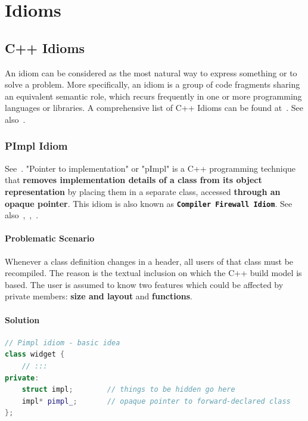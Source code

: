 \chapter{Idioms}
\label{chap:idioms}
\section{C++ Idioms}
An idiom can be considered as the most natural way to express something 
or to solve a problem. More specifically, an idiom is a group of code 
fragments sharing an equivalent semantic role, which recurs frequently in 
one or more programming languages or libraries.
\newline
A comprehensive list of C++ Idioms can be found at~\cite{wiki-idiom-list}.
See also~\cite{youtube-cpp-idioms-everyone}.

\subsection{PImpl Idiom}
See~\cite{cppreference-pimpl}.
\newline
"Pointer to implementation" or "pImpl" is a C++ programming technique 
that \textbf{removes implementation details of a class from its object representation} 
by placing them in a separate class, accessed \textbf{through an opaque pointer}.
\newline
This idiom is also known as \textbf{\texttt{Compiler Firewall Idiom}}.
See also~\cite{wiki-pimpl},~\cite{gotw-24-compilefirewalls},~\cite{gotw-100-compilfirewalls}.

\subsubsection*{Problematic Scenario}
Whenever a class definition changes in a header, all users of that class 
must be recompiled. The reason is the textual inclusion on which 
the C++ build model is based. The user is assumed to know two features 
which could be affected by private members: \textbf{size and layout} 
and \textbf{functions}.

\subsubsection*{Solution}
\begin{lstlisting}[language=C++]
// Pimpl idiom - basic idea
class widget {
    // :::
private:
    struct impl;        // things to be hidden go here
    impl* pimpl_;       // opaque pointer to forward-declared class
};    
\end{lstlisting}


